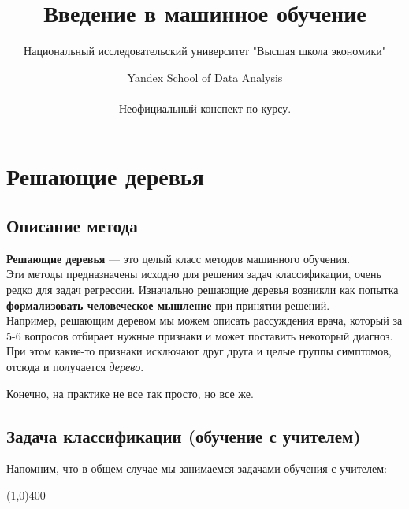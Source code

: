 \documentclass{article}
\title{Введение в машинное обучение}
\author{Национальный исследовательский университет "Высшая школа экономики" \and Yandex School of Data Analysis\\\\
Неофициальный конспект по курсу.}
\begin{document}
\maketitle
\tableofcontents
\newpage

\section{Решающие деревья}

\subsection{Описание метода}
\textbf{Решающие деревья} --- это целый класс методов машинного обучения.
\\

Эти методы предназначены исходно для решения задач классификации, очень редко для задач регрессии. Изначально решающие деревья возникли как попытка \textbf{формализовать человеческое мышление} при принятии решений.
\\

Например, решающим деревом мы можем описать рассуждения врача, который за 5-6 вопросов отбирает нужные признаки и может поставить некоторый диагноз. При этом какие-то признаки исключают друг друга и целые группы симптомов, отсюда и получается \textit{дерево}.

Конечно, на практике не все так просто, но все же.

\subsection{Задача классификации (обучение с учителем)}

Напомним, что в общем случае мы занимаемся задачами обучения с учителем:

\begin{center}
\line(1,0){400}
\end{center}
\end{document}
